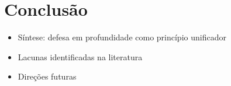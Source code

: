 {
\color{olive}

\section{
    Conclusão
} \label{sec:conclusion}

\begin{itemize}
    \item Síntese: defesa em profundidade como princípio unificador
    \item Lacunas identificadas na literatura
    \item Direções futuras
\end{itemize}

\lipsum[1-2]
}